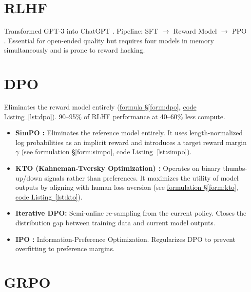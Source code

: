 \section{RLHF}

Transformed GPT-3 into ChatGPT \parencite{ouyang2022training}. Pipeline: SFT $\rightarrow$ Reward Model $\rightarrow$ PPO \parencite{schulman2017proximal}. Essential for open-ended quality but requires four models in memory simultaneously and is prone to reward hacking.

\section{DPO}

Eliminates the reward model entirely \parencite{rafailov2023direct} (\hyperref[form:dpo]{formula \S\ref*{form:dpo}}, \hyperref[lst:dpo]{code Listing~\ref*{lst:dpo}}). 90--95\% of RLHF performance at 40--60\% less compute.

\begin{keyinsight}
\begin{itemize}
  \item \textbf{SimPO \parencite{meng2024simpo}:} Eliminates the reference model entirely. It uses length-normalized log probabilities as an implicit reward and introduces a target reward margin $\gamma$ (see \hyperref[form:simpo]{formulation \S\ref*{form:simpo}}, \hyperref[lst:simpo]{code Listing~\ref*{lst:simpo}}).
  \item \textbf{KTO (Kahneman-Tversky Optimization) \parencite{ethayarajh2024kto}:} Operates on binary thumbs-up/down signals rather than preferences. It maximizes the utility of model outputs by aligning with human loss aversion (see \hyperref[form:kto]{formulation \S\ref*{form:kto}}, \hyperref[lst:kto]{code Listing~\ref*{lst:kto}}).
  \item \textbf{Iterative DPO:} Semi-online re-sampling from the current policy. Closes the distribution gap between training data and current model outputs.
  \item \textbf{IPO \parencite{azar2024ipo}:} Information-Preference Optimization. Regularizes DPO to prevent overfitting to preference margins.
\end{itemize}
\end{keyinsight}

\section{GRPO}


